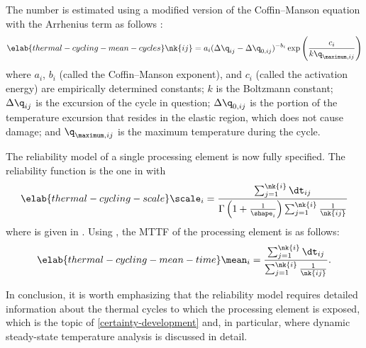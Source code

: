 The number  is estimated using a modified version of the Coffin--Manson
equation with the Arrhenius term as follows \cite{xiang2010, jedec2016}:
\begin{equation} \elab{thermal-cycling-mean-cycles}
  \nk{ij} = a_i (\Delta\q_{ij} - \Delta\q_{0, ij})^{-b_i} \exp\left(\frac{c_i}{k \q_{\maximum, ij}}\right)
\end{equation}
where $a_i$, $b_i$ (called the Coffin--Manson exponent), and $c_i$ (called the
activation energy) are empirically determined constants; $k$ is the Boltzmann
constant; $\Delta\q_{ij}$ is the excursion of the cycle in question;
$\Delta\q_{0, ij}$ is the portion of the temperature excursion that resides in
the elastic region, which does not cause damage; and $\q_{\maximum, ij}$ is the
maximum temperature during the cycle.

The reliability model of a single processing element is now fully specified. The
reliability function is the one in  with
\begin{equation} \elab{thermal-cycling-scale}
  \scale_i = \frac{\sum_{j = 1}^{\nk{i}} \dt_{ij}}{\Gamma\left(1 + \frac{1}{\shape_i}\right) \sum_{j = 1}^{\nk{i}} \frac{1}{\nk{ij}}}
\end{equation}
where  is given in . Using
, the \ac{MTTF} of the processing element is as
follows:
\begin{equation} \elab{thermal-cycling-mean-time}
  \mean_i = \frac{\sum_{j = 1}^{\nk{i}} \dt_{ij}}{\sum_{j = 1}^{\nk{i}} \frac{1}{\nk{ij}}}.
\end{equation}

In conclusion, it is worth emphasizing that the reliability model requires
detailed information about the thermal cycles to which the processing element is
exposed, which is the topic of \cref{certainty-development} and, in particular,
 where dynamic steady-state temperature analysis
is discussed in detail.
